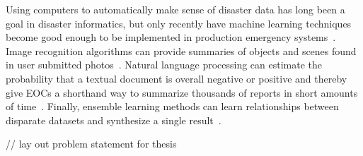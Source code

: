 	Using computers to automatically make sense of disaster data has long
	been a goal in disaster informatics, but only recently have machine
	learning techniques become good enough to be implemented in production
	emergency systems~\cite{meierDigitalHumanitariansHow2015}. Image
	recognition algorithms can provide summaries of objects and scenes found
	in user submitted photos~\cite{nguyenRapidClassificationCrisisRelated,
	donahueDeCAFDeepConvolutional2013}. Natural language processing can
	estimate the probability that a textual document is overall negative or
	positive and thereby give EOCs a shorthand way to summarize thousands of
	reports in short amounts of
	time~\cite{nguyenRapidClassificationCrisisRelated,
	nagyCrowdSentimentDetection2012}. Finally, ensemble learning methods can
	learn relationships between disparate datasets and synthesize a single
	result~\cite{mouzannarDamageIdentificationSocial2018}.

	// lay out problem statement for thesis
